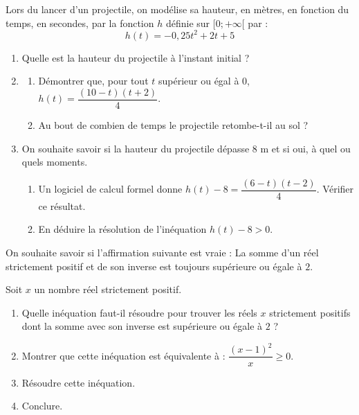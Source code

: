 {\begin{Exercice}
Lors du lancer d'un projectile, on modélise sa hauteur, en mètres, en fonction du temps, en secondes, par la fonction $h$ définie sur $[0 ; +\infty[$ par :
$$h(t) = -0,25t^2 + 2t + 5$$
\begin{enumerate}
    \item Quelle est la hauteur du projectile à l'instant initial ?
    \item \begin{enumerate}
        \item Démontrer que, pour tout $t$ supérieur ou égal à $0$, $ h(t) = \dfrac{(10 - t)(t + 2)}{4}.$
        \item Au bout de combien de temps le projectile retombe-t-il au sol ?
    \end{enumerate}
    \item On souhaite savoir si la hauteur du projectile dépasse $8$ m et si oui, à quel ou quels moments.
    \begin{enumerate}
        \item Un logiciel de calcul formel donne $h(t) - 8 = \dfrac{(6 - t)(t - 2)}{4}.$
        Vérifier ce résultat.
        \item En déduire la résolution de l'inéquation $h(t) - 8 > 0$.
    \end{enumerate}
\end{enumerate}
\vspace{-0.3cm}
\end{Exercice}



\newpage



\begin{Exercice}

On souhaite savoir si l'affirmation suivante est vraie : 
\og La somme d'un réel strictement positif et de son inverse est toujours supérieure ou égale à $2$. \fg{}

Soit $x$ un nombre réel strictement positif.

\begin{enumerate}
    \item Quelle inéquation faut-il résoudre pour trouver les réels $x$ strictement positifs dont la somme avec son inverse est supérieure ou égale à $2$ ?
    \item Montrer que cette inéquation est équivalente à : $\dfrac{(x - 1)^2}{x} \geq 0.$
    \item Résoudre cette inéquation.
    \item Conclure.
\end{enumerate}


\end{Exercice}}
